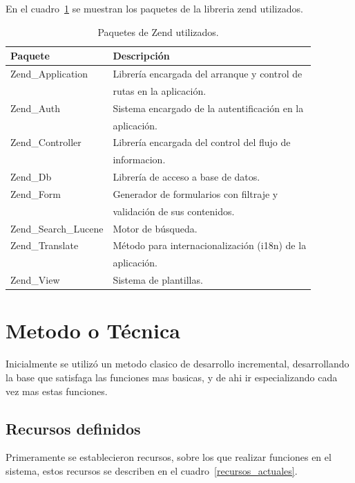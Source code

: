 \documentclass[letter,12pt]{article}
\begin{document}
En el cuadro~\ref{herramientas_zend} se muestran los paquetes de la libreria zend utilizados.

\begin{table}
\begin{tabular}{l|l}
Paquete & Descripción \\
\hline
Zend\_Application     & Librería encargada del arranque y control de    \\
					  & rutas en la aplicación. \\
Zend\_Auth            & Sistema encargado de la autentificación en la   \\
					  & aplicación. \\
Zend\_Controller      & Librería encargada del control del flujo de     \\
				      & informacion. \\
Zend\_Db              & Librería de acceso a base de datos. \\
Zend\_Form            & Generador de formularios con filtraje y         \\
					  & validación de sus contenidos. \\
Zend\_Search\_Lucene  & Motor de búsqueda. \\
Zend\_Translate       & Método para internacionalización (i18n) de la   \\
				      & aplicación. \\
Zend\_View            & Sistema de plantillas. \\
\end{tabular}
\caption{Paquetes de Zend utilizados.}
\label{herramientas_zend}
\end{table}

\section{Metodo o Técnica}
Inicialmente se utilizó un metodo clasico de desarrollo incremental, de\-sa\-rro\-llan\-do la base que satisfaga las funciones
mas basicas, y de ahi ir especializando cada vez mas estas funciones.

\subsection{Recursos definidos}
Primeramente se establecieron recursos, sobre los que realizar funciones en el sistema, estos recursos se describen en el
cuadro~\ref{recursos_actuales}.
\end{document}
